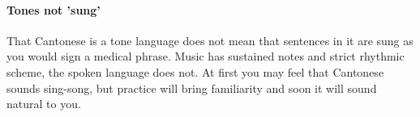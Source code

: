 \paragraph{Tones not 'sung'}

That Cantonese is a tone language does not mean that sentences in it are sung as you would sign a medical phrase. Music has sustained notes and strict rhythmic scheme, the spoken language does not. At first you may feel that Cantonese sounds sing-song, but practice will bring familiarity and soon it will sound natural to you.